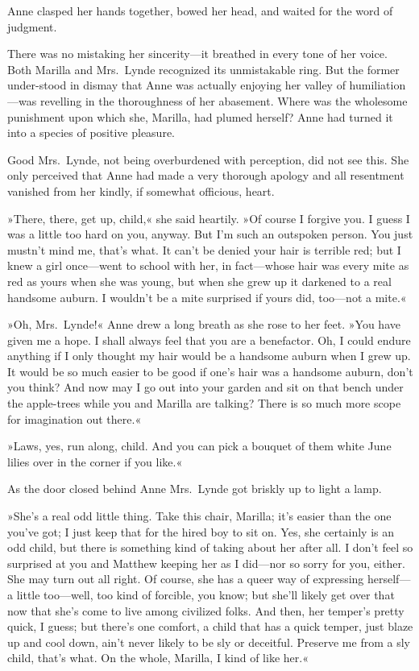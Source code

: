 Anne clasped her hands together, bowed her head, and waited for the word of judgment.

There was no mistaking her sincerity—it breathed in every tone of her voice. Both Marilla and Mrs.~Lynde recognized its unmistakable ring. But the former under-stood in dismay that Anne was actually enjoying her valley of humiliation—was revelling in the thoroughness of her abasement. Where was the wholesome punishment upon which she, Marilla, had plumed herself? Anne had turned it into a species of positive pleasure.

Good Mrs.~Lynde, not being overburdened with perception, did not see this. She only perceived that Anne had made a very thorough apology and all resentment vanished from her kindly, if somewhat officious, heart.

»There, there, get up, child,« she said heartily. »Of course I forgive you. I guess I was a little too hard on you, anyway. But I'm such an outspoken person. You just mustn't mind me, that's what. It can't be denied your hair is terrible red; but I knew a girl once—went to school with her, in fact—whose hair was every mite as red as yours when she was young, but when she grew up it darkened to a real handsome auburn. I wouldn't be a mite surprised if yours did, too—not a mite.«

»Oh, Mrs.~Lynde!« Anne drew a long breath as she rose to her feet. »You have given me a hope. I shall always feel that you are a benefactor. Oh, I could endure anything if I only thought my hair would be a handsome auburn when I grew up. It would be so much easier to be good if one's hair was a handsome auburn, don't you think? And now may I go out into your garden and sit on that bench under the apple-trees while you and Marilla are talking? There is so much more scope for imagination out there.«

»Laws, yes, run along, child. And you can pick a bouquet of them white June lilies over in the corner if you like.«

As the door closed behind Anne Mrs.~Lynde got briskly up to light a lamp.

»She's a real odd little thing. Take this chair, Marilla; it's easier than the one you've got; I just keep that for the hired boy to sit on. Yes, she certainly is an odd child, but there is something kind of taking about her after all. I don't feel so surprised at you and Matthew keeping her as I did—nor so sorry for you, either. She may turn out all right. Of course, she has a queer way of expressing herself—a little too—well, too kind of forcible, you know; but she'll likely get over that now that she's come to live among civilized folks. And then, her temper's pretty quick, I guess; but there's one comfort, a child that has a quick temper, just blaze up and cool down, ain't never likely to be sly or deceitful. Preserve me from a sly child, that's what. On the whole, Marilla, I kind of like her.«

